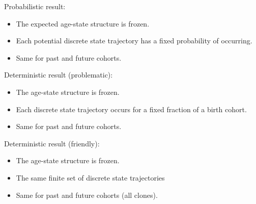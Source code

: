 \documentclass[20pt,usenames,dvipsnames]{beamer}
\begin{document}
\begin{frame}[plain]
\Large
\centering
Probabilistic result:
\begin{itemize}[<+->]
\item The expected age-state structure is frozen.
\item Each potential discrete state trajectory has a fixed probability of
occurring.
\item Same for past and future cohorts.
\end{itemize}
\end{frame}

\begin{frame}[plain]
\Large
\centering
Deterministic result (problematic):
\begin{itemize}[<+->]
\item The age-state structure is frozen.
\item Each discrete state trajectory occurs for a fixed fraction of a birth
cohort.
\item Same for past and future cohorts.
\end{itemize}
\end{frame}

\begin{frame}[plain]
\Large
\centering
Deterministic result (friendly):
\begin{itemize}[<+->]
\item The age-state structure is frozen.
\item The same finite set of discrete state trajectories
\item Same for past and future cohorts (all clones).
\end{itemize}
\end{frame}
\end{document}
